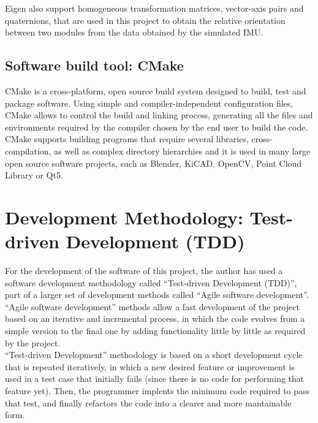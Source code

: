 Eigen also support homogeneous transformation matrices, vector-axis pairs and quaternions, that are used in this project to obtain the relative orientation between two modules from the data obtained by the simulated IMU.\\

\subsection{Software build tool: CMake}
\label{software_cmake}

CMake \cite{cmake:website} is a cross-platform, open source build system designed to build, test and package software. Using simple and compiler-independent configuration files, CMake allows to control the build and linking process, generating all the files and environments required by the compiler chosen by the end user to build the code.\\

CMake  supports building programs that require several libraries, cross-compilation, as well as complex directory hierarchies and it is used in many large open source software projects, such as Blender, KiCAD, OpenCV, Point Cloud Library or Qt5.


\section{Development Methodology: Test-driven Development (TDD)}
\label{software_TDD}

For the development of the software of this project, the author has used a software development methodology called ``Test-driven Development (TDD)'', part of a larger set of development methods called ``Agile software development''. ``Agile software development'' methods allow a fast development of the project based on an iterative and incremental process, in which the code evolves from a simple version to the final one by adding functionality little by little as required by the project.\\

``Test-driven Development'' methodology \cite{tdd:book} is based on a short development cycle that is repeated iteratively, in which a new desired feature or improvement is used in a test case that initially fails (since there is no code for performing that feature yet). Then, the programmer implents the minimum code required to pass that test, and finally refactors the code into a clearer and more mantainable form.\\

